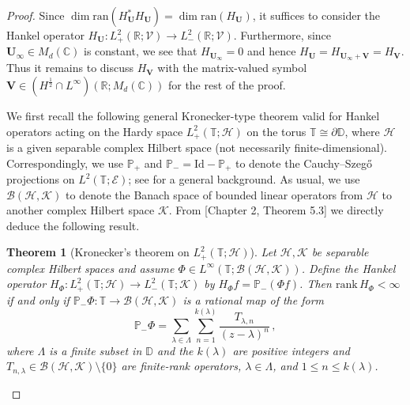 \documentclass[11pt,reqno]{amsart}
\newtheorem{thm}{Theorem}[section]
\theoremstyle{definition}
\theoremstyle{remark}
\theoremstyle{remark}
\numberwithin{equation}{section}
\newcommand{\C}{\mathbb{C}}
\newcommand{\R}{\mathbb{R}}
\newcommand{\T}{\mathbb{T}}
\newcommand{\VV}{\mathcal{V}}
\newcommand{\ran}{\mathrm{ran}}
\newcommand{\rank}{\mathrm{rank}}
\newcommand{\pt}{\partial}
\newcommand{\Vb}{\mathbf{V}}
\newcommand{\Ub}{\mathbf{U}}
\newcommand{\id}{\mathrm{Id}}
\begin{document}
\begin{proof}
Since $\dim \ran(H_{\Ub}^* H_{\Ub}) = \dim \ran(H_{\Ub})$, it suffices to consider the Hankel operator $H_{\Ub} : L^2_+(\R; \VV) \to L^2_-(\R; \VV)$. Furthermore, since $\Ub_\infty \in M_d(\C)$ is constant, we see that $H_{\Ub_\infty}=0$ and hence $H_{\Ub}= H_{\Ub_\infty + \Vb} = H_{\Vb}$. Thus it remains to discuss $H_{\Vb}$ with the matrix-valued symbol $\Vb \in (H^{\frac 1 2} \cap L^\infty)(\R; M_d(\C))$ for the rest of the proof.

We first recall the following general Kronecker-type theorem valid for Hankel operators acting on the Hardy space $L_+^2(\T; \mathcal{H})$ on the torus $\T \cong \pt \mathbb{D}$, where $\mathcal{H}$ is a given separable complex Hilbert space (not necessarily finite-dimensional). Correspondingly, we use $\mathbb{P}_+$ and $\mathbb{P}_- = \id - \mathbb{P}_+$ to denote the Cauchy--Szeg\H{o} projections on $L^2(\T; \mathcal{E})$; see \cite{Pe-03} for a general background. As usual, we use $\mathcal{B}(\mathcal{H}, \mathcal{K})$ to denote the Banach space of bounded linear operators from $\mathcal{H}$ to another complex Hilbert space $\mathcal{K}$. From \cite{Pe-03}[Chapter 2, Theorem 5.3] we directly deduce the following result. 

\begin{thm}[Kronecker's theorem on $L^2_+(\T; \mathcal{H})$]
Let $\mathcal{H}, \mathcal{K}$ be separable complex Hilbert spaces and assume $\Phi \in L^\infty(\T; \mathcal{B}(\mathcal{H}, \mathcal{K}))$. Define the Hankel operator $H_\Phi : L^2_+(\T; \mathcal{H}) \to L^2_-(\T; \mathcal{K})$ by $H_\Phi f = \mathbb{P}_-(\Phi f)$. Then $\rank \, H_\Phi < \infty$ if and only if $\mathbb{P}_- \Phi : \T \to \mathcal{B}(\mathcal{H}, \mathcal{K})$ is a rational map of the form
$$
\mathbb{P}_- \Phi = \sum_{\lambda \in \Lambda} \sum_{n=1}^{k(\lambda)} \frac{T_{\lambda, n}}{(z- \lambda)^n} \, ,
$$
where $\Lambda$ is a finite subset in $\mathbb{D}$ and the $k(\lambda)$ are positive integers and $T_{n, \lambda} \in \mathcal{B}(\mathcal{H}, \mathcal{K}) \setminus \{ 0 \}$ are finite-rank operators, $\lambda \in \Lambda$, and $1 \leq n \leq k(\lambda)$.
\end{thm}


\end{proof}
\end{document}
